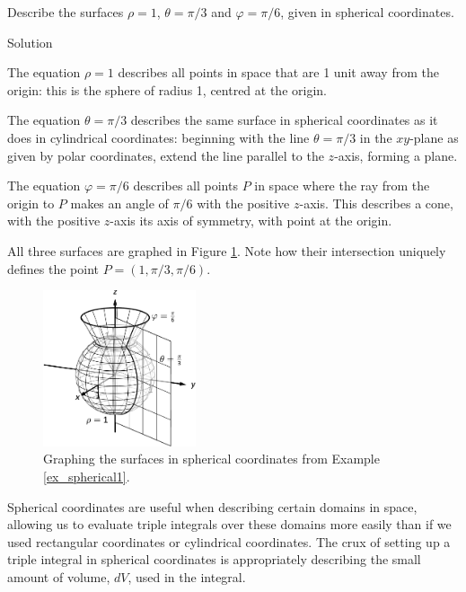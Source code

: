 \begin{example}
\label{ex_spherical1}Describe the surfaces $\rho=1$, $\theta = \pi/3$ and $\varphi = \pi/6$, given in spherical coordinates.

Solution 

The equation $\rho = 1$ describes all points in space that are 1 unit away from the origin: this is the sphere of radius 1, centred at the origin.

The equation $\theta = \pi/3$ describes the same surface in spherical coordinates as it does in cylindrical coordinates: beginning with the line $\theta = \pi/3$ in the $xy$-plane as given by polar coordinates, extend the line parallel to the $z$-axis, forming a plane.

The equation $\varphi=\pi/6$ describes all points $P$ in space where the ray from the origin to $P$ makes an angle of $\pi/6$ with the positive $z$-axis. This describes a cone, with the positive $z$-axis its axis of symmetry, with point at the origin. 

All three surfaces are graphed in Figure \ref{fig_multiple_32}. Note how their intersection uniquely defines the point $P=(1,\pi/3,\pi/6)$.
\begin{figure}[H]
	\begin{center}
			\includegraphics[width=0.4\textwidth]{fig_multiple_32}
	\caption{Graphing the surfaces in spherical coordinates from Example \ref{ex_spherical1}.}
	\label{fig_multiple_32}
	\end{center}
\end{figure}
\vspace*{-0.5cm}
\end{example}


Spherical coordinates are useful when describing certain domains in space, allowing us to evaluate triple integrals over these domains more easily than if we used rectangular coordinates or cylindrical coordinates. The crux of setting up a triple integral in spherical coordinates is appropriately describing the small amount of volume, $dV$, used in the integral.

